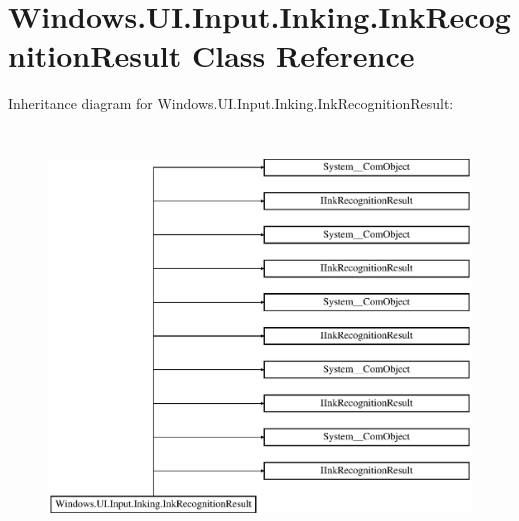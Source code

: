 \hypertarget{class_windows_1_1_u_i_1_1_input_1_1_inking_1_1_ink_recognition_result}{}\section{Windows.\+U\+I.\+Input.\+Inking.\+Ink\+Recognition\+Result Class Reference}
\label{class_windows_1_1_u_i_1_1_input_1_1_inking_1_1_ink_recognition_result}
Inheritance diagram for Windows.\+U\+I.\+Input.\+Inking.\+Ink\+Recognition\+Result\+:\begin{figure}[H]
\begin{center}
\leavevmode
\includegraphics[height=11.000000cm]{class_windows_1_1_u_i_1_1_input_1_1_inking_1_1_ink_recognition_result}
\end{center}
\end{figure}
